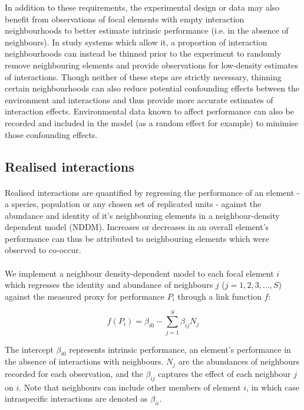 \documentclass[a4,12pt]{article}
\begin{document}
    In addition to these requirements, the experimental design or data may also benefit from observations of focal elements with empty interaction neighbourhoods to better estimate intrinsic performance (i.e. in the absence of neighbours). In study systems which allow it, a proportion of interaction neighbourhoods can instead be thinned prior to the experiment to randomly remove neighbouring elements and provide observations for low-density estimates of interactions. Though neither of these steps are strictly necessary, thinning certain neighbourhoods can also reduce potential confounding effects between the environment and interactions and thus provide more accurate estimates of interaction effects. Environmental data known to affect performance can also be recorded and included in the model (as a random effect for example) to minimise those confounding effects.
 
    
    \subsection{Realised interactions}
        
        \paragraph{}
        Realised interactions are quantified by regressing the performance of an element  - a species, population or any chosen set of replicated units - against the abundance and identity of it's neighbouring elements in a neighbour-density dependent model (NDDM).  Increases or decreases in an overall element's performance can thus be attributed to neighbouring elements which were observed to co-occur. 

        \paragraph{}
        We implement a neighbour density-dependent model to each focal element $i$ which regresses the identity and abundance of neighbours $j$ ($j = 1, 2, 3, ..., S$) against the measured proxy for performance $P_{i}$ through a link function $f$:
        
        \begin{equation}
        f(P_{i}) = \beta_{i0} - \sum_{j=1}^{S} \beta_{ij} N_{j}
        \label{nddm}
        \end{equation}
        
        The intercept $\beta_{i0}$ represents intrinsic performance, an element's performance in the absence of interactions with neighbours. $N_{j}$ are the abundances of neighbours recorded for each observation, and the $\beta_{ij}$ captures the effect of each neighbour $j$ on $i$. Note that neighbours can include other members of element $i$, in which case intraspecific interactions are denoted as $\beta_{ii}$.
\end{document}
